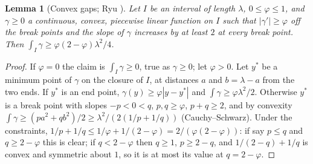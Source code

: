 \documentclass[11pt,letterpaper]{amsart}
\theoremstyle{plain}
\newtheorem{lemma}[theorem]{Lemma}
\theoremstyle{definition}
\theoremstyle{remark}
\begin{document}
\begin{lemma}[Convex gaps; Ryu \cite{Ryu26b}]\label{lem:convex}
Let $I$ be an interval of length $\lambda$, $0\le\varphi\le1$, and $\gamma\ge0$ a continuous, convex, piecewise linear function on $I$ such that $|\gamma'|\ge\varphi$ off the break points and the slope of $\gamma$ increases by at least $2$ at every break point. Then $\int_I\gamma\ge\varphi(2-\varphi)\lambda^2/4$.
\end{lemma}
\begin{proof}
If $\varphi=0$ the claim is $\int_I\gamma\ge0$, true as $\gamma\ge0$; let $\varphi>0$. Let $y^*$ be a minimum point of $\gamma$ on the closure of $I$, at distances $a$ and $b=\lambda-a$ from the two ends. If $y^*$ is an end point, $\gamma(y)\ge\varphi|y-y^*|$ and $\int\gamma\ge\varphi\lambda^2/2$. Otherwise $y^*$ is a break point with slopes $-p<0<q$, $p,q\ge\varphi$, $p+q\ge2$, and by convexity $\int\gamma\ge(pa^2+qb^2)/2\ge\lambda^2/(2(1/p+1/q))$ (Cauchy--Schwarz). Under the constraints, $1/p+1/q\le1/\varphi+1/(2-\varphi)=2/(\varphi(2-\varphi))$: if say $p\le q$ and $q\ge2-\varphi$ this is clear; if $q<2-\varphi$ then $q\ge1$, $p\ge2-q$, and $1/(2-q)+1/q$ is convex and symmetric about $1$, so it is at most its value at $q=2-\varphi$.
\end{proof}
\end{document}
